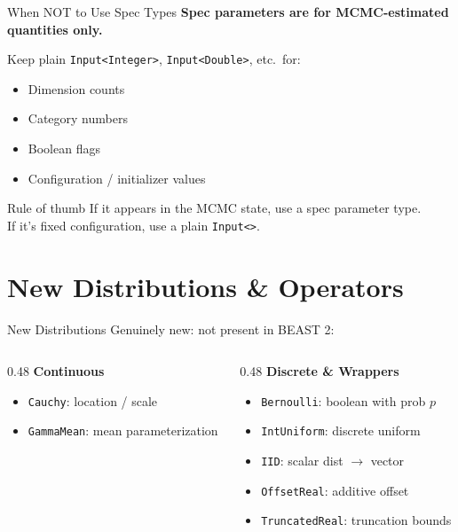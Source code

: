 \documentclass[aspectratio=169,11pt]{beamer}
\newcommand{\code}[1]{\texttt{#1}}
\begin{document}
\begin{frame}{When NOT to Use Spec Types}
\textbf{Spec parameters are for MCMC-estimated quantities only.}

\vspace{1em}
Keep plain \code{Input<Integer>}, \code{Input<Double>}, etc.\ for:
\begin{itemize}
\item Dimension counts
\item Category numbers
\item Boolean flags
\item Configuration / initializer values
\end{itemize}

\vspace{1em}
\begin{exampleblock}{Rule of thumb}
If it appears in the MCMC state, use a spec parameter type.\\
If it's fixed configuration, use a plain \code{Input<>}.
\end{exampleblock}
\end{frame}

\section{New Distributions \& Operators}

\begin{frame}{New Distributions}
Genuinely new: not present in BEAST 2:

\vspace{0.5em}
\begin{columns}[T]
\begin{column}{0.48\textwidth}
\textbf{Continuous}
\begin{itemize}
\item \code{Cauchy}: location / scale
\item \code{GammaMean}: mean parameterization
\end{itemize}
\end{column}
\begin{column}{0.48\textwidth}
\textbf{Discrete \& Wrappers}
\begin{itemize}
\item \code{Bernoulli}: boolean with prob $p$
\item \code{IntUniform}: discrete uniform
\item \code{IID}: scalar dist $\to$ vector
\item \code{OffsetReal}: additive offset
\item \code{TruncatedReal}: truncation bounds
\end{itemize}
\end{column}
\end{columns}
\end{frame}
\end{document}
